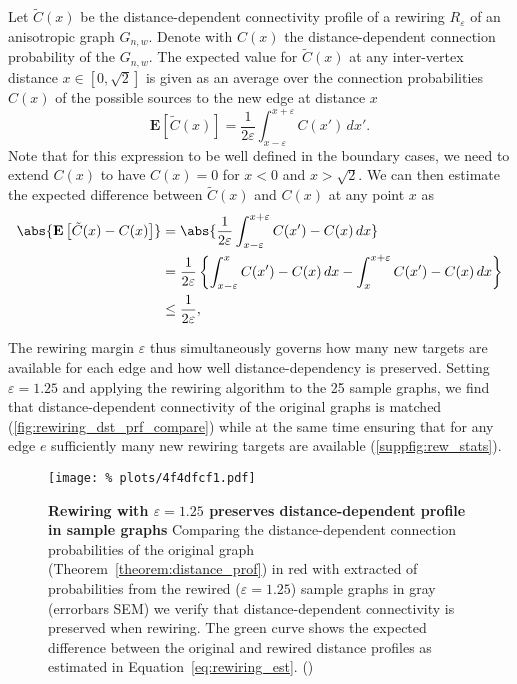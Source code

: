 Let $\tilde{C}(x)$ be the distance-de\-pen\-dent connectivity profile
of a rewiring $R_{\varepsilon}$ of an anisotropic graph
$G_{n,w}$. Denote with $C(x)$ the distance-de\-pen\-dent connection
probability of the $G_{n,w}$. The expected value for $\tilde{C}(x)$ at
any inter-vertex distance $x \in [0,\sqrt{2}]$ is given as an average
over the connection probabilities $C(x)$ of the possible sources to
the new edge at distance $x$
\[
\mathbf{E}\left[\tilde{C}(x)\right] =
  \frac{1}{2\varepsilon}\int_{x-\varepsilon}^{x+\varepsilon} C(x') \,
  dx'.
\]
Note that for this expression to be well defined in the boundary
cases, we need to extend $C(x)$ to have $C(x) = 0$ for $x<0$ and
$x>\sqrt{2}$.  We can then estimate the expected difference between
$\tilde{C}(x)$ and $C(x)$ at any point $x$ as
\begin{align}
  \abs{\mathbf{E}\left[\tilde{C}(x) - C(x)\right]}  
    & = \abs{\frac{1}{2\varepsilon}\int_{x-\varepsilon}^{x+\varepsilon}
        C(x') - C(x) \, dx} \notag\\
    & = \frac{1}{2\varepsilon} \left\{ \int_{x-\varepsilon}^{x} C(x') -
        C(x) \, dx - \int_x^{x+\varepsilon} C(x') - C(x) \, dx
        \right\} \notag\\
    & \leq  \frac{1}{2\varepsilon}, \label{eq:rewiring_est}
\end{align}

The rewiring margin $\varepsilon$ thus simultaneously governs how many
new targets are available for each edge and how well
distance-dependency is preserved. Setting $\varepsilon = 1.25$ 
and applying the rewiring algorithm to the 25 sample graphs, we find
that distance-dependent connectivity of the original graphs is matched
(\autoref{fig:rewiring_dst_prf_compare}) while at the same time
ensuring that for any edge $e$ sufficiently many new rewiring targets
are available (\autoref{suppfig:rew_stats}).

\begin{figure}[H]
  \centering
  \texttt{[image: \%
    plots/4f4dfcf1.pdf]} 
  \captionsetup{skip=0pt}
  \caption{\textbf{Rewiring with \boldmath$\varepsilon = 1.25$
      preserves distance-dependent profile in sample graphs} Comparing
    the distance-dependent connection probabilities of the original
    graph (Theorem~\ref{theorem:distance_prof}) in red with extracted
    of probabilities from the rewired ($\varepsilon = 1.25$) sample
    graphs in gray (errorbars SEM\protect\footnotemark) we verify that
    distance-dependent connectivity is preserved when rewiring. The
    green curve shows the expected difference between the original and
    rewired distance profiles as estimated in
    Equation~\ref{eq:rewiring_est}. ()}
  \label{fig:rewiring_dst_prf_compare}
\end{figure}


